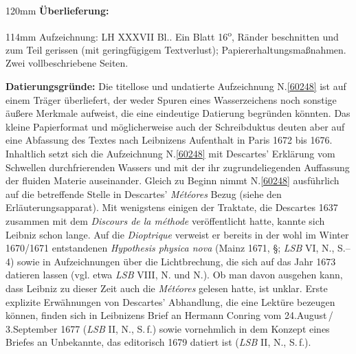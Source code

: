 %
\frenchspacing%
\begin{ledgroupsized}[r]{120mm}%
\footnotesize%
\pstart%
\noindent%
\textbf{Überlieferung:}%
\pend%
\end{ledgroupsized}%
\begin{ledgroupsized}[r]{114mm}%
\footnotesize%
\pstart%
\parindent -6mm%
%
Aufzeichnung:
LH XXXVII Bl..
Ein Blatt 16\textsuperscript{o},
Ränder beschnitten und zum Teil gerissen (mit geringfügigem Textverlust);
Papiererhaltungsmaßnahmen.
Zwei vollbeschriebene Seiten.
\pend%
\end{ledgroupsized}%
\vspace{5mm}%
\begin{ledgroup}%
\footnotesize%
\pstart%
\noindent%
\textbf{Datierungsgründe:}
Die titellose und undatierte Aufzeichnung N.\;\ref{60248} ist auf einem Träger überliefert, der weder Spuren eines Wasserzeichens noch sonstige äußere Merkmale aufweist, die eine eindeutige Datierung begründen könnten.
Das kleine Papierformat und möglicherweise auch der Schreibduktus deuten aber auf eine Abfassung des Textes nach Leibnizens Aufenthalt in Paris 1672 bis 1676.
\pend%
\pstart%
Inhaltlich setzt sich die Aufzeichnung N.\;\ref{60248} mit Descartes' Erklärung vom Schwellen durchfrierenden Wassers und mit der ihr zugrundeliegenden Auffassung der fluiden Materie auseinander.
Gleich zu Beginn nimmt N.\;\ref{60248} ausführlich auf die betreffende Stelle in Descartes' \textit{Météores} Bezug (siehe den Erläuterungsapparat).\cite{01489}
Mit wenigstens einigen der Traktate, die Descartes 1637 zusammen mit dem \textit{Discours de la méthode} veröffentlicht hatte, kannte sich Leibniz schon lange.
Auf die \textit{Dioptrique}\cite{00038} verweist er bereits in der wohl im Winter 1670/1671 entstandenen \textit{Hypothesis physica nova} (Mainz 1671, §; \textit{LSB} VI, N., S.--4)\cite{00256} sowie in Aufzeichnungen über die Lichtbrechung, die sich auf das Jahr 1673 datieren lassen (vgl. etwa \textit{LSB} VIII, N.\cite{02610} und N.).\cite{02611}
Ob man davon ausgehen kann, dass Leibniz zu dieser Zeit auch die \textit{Météores}\cite{01489} gelesen hatte, ist unklar.
Erste explizite Erwähnungen von Descartes' Abhandlung, die eine Lektüre bezeugen können, finden sich in Leibnizens Brief an Hermann Conring vom 24.\;August\,/\,3.\;September 1677 (\textit{LSB} II, N., S.\,f.)\cite{02612} sowie vornehmlich in dem Konzept eines Briefes an Unbekannte, das editorisch 1679 datiert ist (\textit{LSB} II, N., S.\,f.).\cite{01311}

\end{ledgroup}
